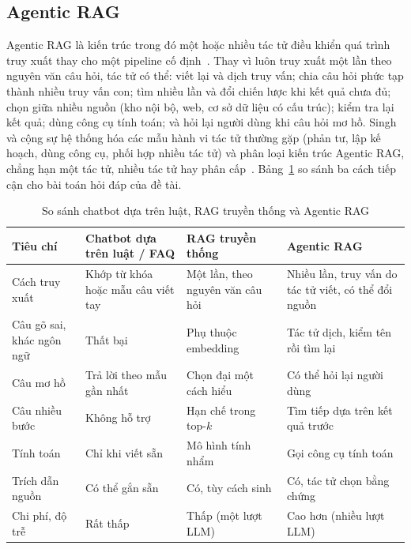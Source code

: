 \subsection{Agentic RAG}
\label{sec:agentic_rag}

Agentic RAG là kiến trúc trong đó một hoặc nhiều tác tử điều khiển quá trình truy xuất thay cho một pipeline cố định~\cite{singh2025agenticrag}. Thay vì luôn truy xuất một lần theo nguyên văn câu hỏi, tác tử có thể: viết lại và dịch truy vấn; chia câu hỏi phức tạp thành nhiều truy vấn con; tìm nhiều lần và đổi chiến lược khi kết quả chưa đủ; chọn giữa nhiều nguồn (kho nội bộ, web, cơ sở dữ liệu có cấu trúc); kiểm tra lại kết quả; dùng công cụ tính toán; và hỏi lại người dùng khi câu hỏi mơ hồ. Singh và cộng sự hệ thống hóa các mẫu hành vi tác tử thường gặp (phản tư, lập kế hoạch, dùng công cụ, phối hợp nhiều tác tử) và phân loại kiến trúc Agentic RAG, chẳng hạn một tác tử, nhiều tác tử hay phân cấp~\cite{singh2025agenticrag}. Bảng~\ref{tab:compare_paradigm} so sánh ba cách tiếp cận cho bài toán hỏi đáp của đề tài.

\begin{table}[H]
    \centering
    \caption{So sánh chatbot dựa trên luật, RAG truyền thống và Agentic RAG}
    \label{tab:compare_paradigm}
    \small
    \begin{tabularx}{\textwidth}{|>{\raggedright\arraybackslash}p{2.7cm}|>{\raggedright\arraybackslash}X|>{\raggedright\arraybackslash}X|>{\raggedright\arraybackslash}X|}
        \toprule
        \textbf{Tiêu chí} & \textbf{Chatbot dựa trên luật / FAQ} & \textbf{RAG truyền thống} & \textbf{Agentic RAG} \\
        \midrule
        Cách truy xuất & Khớp từ khóa hoặc mẫu câu viết tay & Một lần, theo nguyên văn câu hỏi & Nhiều lần, truy vấn do tác tử viết, có thể đổi nguồn \\ \hline
        Câu gõ sai, khác ngôn ngữ & Thất bại & Phụ thuộc embedding & Tác tử dịch, kiểm tên rồi tìm lại \\ \hline
        Câu mơ hồ & Trả lời theo mẫu gần nhất & Chọn đại một cách hiểu & Có thể hỏi lại người dùng \\ \hline
        Câu nhiều bước & Không hỗ trợ & Hạn chế trong top-$k$ & Tìm tiếp dựa trên kết quả trước \\ \hline
        Tính toán & Chỉ khi viết sẵn & Mô hình tính nhẩm & Gọi công cụ tính toán \\ \hline
        Trích dẫn nguồn & Có thể gắn sẵn & Có, tùy cách sinh & Có, tác tử chọn bằng chứng \\ \hline
        Chi phí, độ trễ & Rất thấp & Thấp (một lượt LLM) & Cao hơn (nhiều lượt LLM) \\
        \bottomrule
    \end{tabularx}
\end{table}

